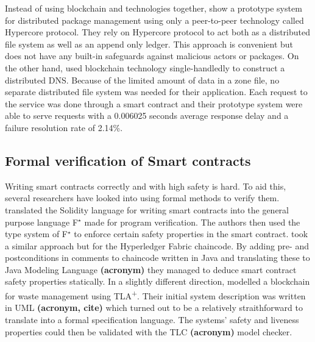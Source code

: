 \documentclass[english, biblatex, digitaloutput]{kththesis}
\begin{document}
Instead of using blockchain and  technologies together, \textcite{blahser_thine_2021} show a prototype system for distributed package management using only a peer-to-peer technology called Hypercore protocol. They rely on Hypercore protocol to act both as a distributed file system as well as an append only ledger. This approach is convenient but does not have any built-in safeguards against malicious actors or packages. On the other hand, \textcite{liu_data_2018} used blockchain technology single-handledly to construct a distributed \gls{DNS}. Because of the limited amount of data in a zone file, no separate distributed file system was needed for their application. Each request to the service was done through a smart contract and their prototype system were able to serve requests with a 0.006025 seconds average response delay and a failure resolution rate of 2.14\%.

\subsection{Formal verification of Smart contracts}

Writing smart contracts correctly and with high safety is hard. To aid this, several researchers have looked into using formal methods to verify them. \textcite{bhargavan_formal_2016} translated the Solidity language for writing smart contracts into the general purpose language F$^{\star}$ made for program verification. The authors then used the type system of F$^{\star}$ to enforce certain safety properties in the smart contract. \textcite{beckert_formal_2018} took a similar approach but for the Hyperledger Fabric chaincode. By adding pre- and postconditions in comments to chaincode written in Java and translating these to Java Modeling Language \textbf{(acronym)} they managed to deduce smart contract safety properties statically. In a slightly different direction, \textcite{latif_blockchain_2019} modelled a blockchain for waste management using TLA\textsuperscript+. Their initial system description was written in UML \textbf{(acronym, cite)} which turned out to be a relatively straithforward to translate into a formal specification language. The systems' safety and liveness properties could then be validated with the TLC \textbf{(acronym)} model checker.


\end{document}
